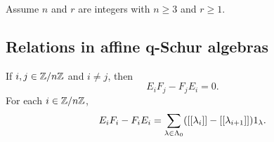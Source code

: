 \documentclass[a4paper, 11pt, twoside]{report}
\begin{document}
Assume $n$ and $r$ are integers with $n\geq 3$ and $r\geq 1$.

\subsection{Relations in affine q-Schur algebras}


\begin{lemma}\label{lemma:q-commutators-E-F}
If $i,j\in\mathbb{Z}/{n \mathbb{Z}}$ and $i\neq j$, then
\begin{equation*}
E_iF_j - F_jE_i = 0.
\end{equation*}
For each $i\in\mathbb{Z}/{n \mathbb{Z}}$,
\begin{equation*}
E_iF_i - F_iE_i = \sum_{\lambda\in\Lambda_0{}} ([[\lambda_i]] - [[\lambda_{i+1}]])1_\lambda.
\end{equation*}
\end{lemma}
\end{document}
